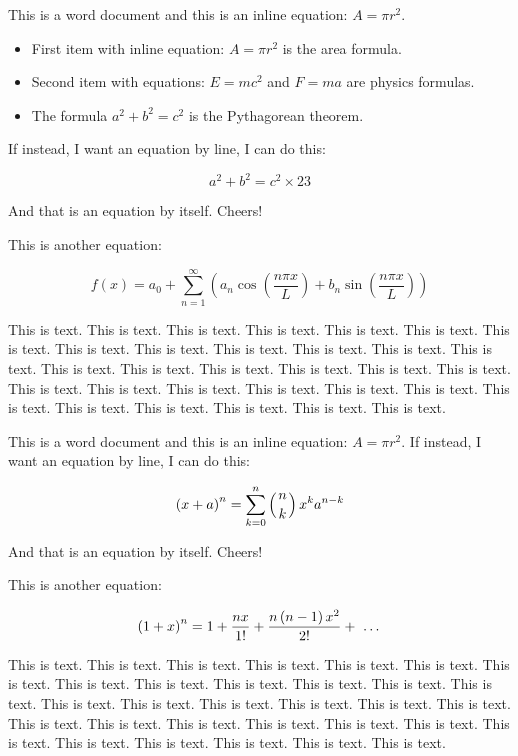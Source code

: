 \documentclass[11pt,a4paper]{article}
\begin{document}
This is a word document and this is an inline equation: $A= \pi r^{2}$.

\begin{itemize}
\item First item with inline equation: $A= \pi r^{2}$ is the area formula.
\item Second item with equations: $E=mc^{2}$ and $F=ma$ are physics formulas.
\item The formula $a^{2}+b^{2}=c^{2}$ is the Pythagorean theorem.
\end{itemize}

If instead, I want an equation by line, I can do this:

$$a^{2}+b^{2}=c^{2} \times 23$$

And that is an equation by itself. Cheers!

This is another equation:

$$f\left(x\right)=a_{0}+\sum_{n=1}^{ \infty }\left(a_{n}\cos(\frac{n \pi x}{L})+b_{n}\sin(\frac{n \pi x}{L})\right)$$

This is text. This is text. This is text. This is text. This is text. This is text. This is text. This is text. This is text. This is text. This is text. This is text. This is text. This is text. This is text. This is text. This is text. This is text. This is text. This is text. This is text. This is text. This is text. This is text. This is text. This is text. This is text. This is text. This is text. This is text. This is text.

This is a word document and this is an inline equation: $A= \pi r^{2}$. If instead, I want an equation by line, I can do this:

$$\left(x+a\right)^{n}=\sum_{k=0}^{n}\left(\genfrac{}{}{0pt}{}{n}{k}\right)x^{k}a^{n-k}$$

And that is an equation by itself. Cheers!

This is another equation:

$$\left(1+x\right)^{n}=1+\frac{nx}{1!}+\frac{n\left(n-1\right)x^{2}}{2!}+ \text{ \textellipsis }$$

This is text. This is text. This is text. This is text. This is text. This is text. This is text. This is text. This is text. This is text. This is text. This is text. This is text. This is text. This is text. This is text. This is text. This is text. This is text. This is text. This is text. This is text. This is text. This is text. This is text. This is text. This is text. This is text. This is text. This is text. This is text.
\end{document}
